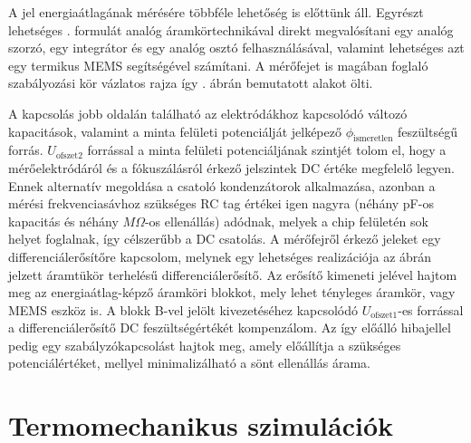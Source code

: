 
A jel energiaátlagának mérésére többféle lehetőség is előttünk áll. Egyrészt lehetséges . formulát analóg áramkörtechnikával direkt megvalósítani egy analóg szorzó, egy integrátor és egy analóg osztó felhasználásával, valamint lehetséges azt egy termikus MEMS segítségével számítani\cite{QTC_MEMS}. A mérőfejet is magában foglaló szabályozási kör vázlatos rajza így . ábrán bemutatott alakot ölti.


A kapcsolás jobb oldalán található az elektródákhoz kapcsolódó változó kapacitások, valamint a minta felületi potenciálját jelképező $\phi_\text{ismeretlen}$ feszültségű forrás. $U_\text{ofszet2}$ forrással a minta felületi potenciáljának szintjét tolom el, hogy a mérőelektródáról és a fókuszálásról érkező jelszintek DC értéke megfelelő legyen. Ennek alternatív megoldása a csatoló kondenzátorok alkalmazása, azonban a mérési frekvenciasávhoz szükséges RC tag értékei igen nagyra (néhány pF-os kapacitás és néhány $M\Omega$-os ellenállás) adódnak, melyek a chip felületén sok helyet foglalnak, így célszerűbb a DC csatolás. A mérőfejről érkező jeleket egy differenciálerősítőre kapcsolom, melynek egy lehetséges realizációja az ábrán jelzett áramtükör terhelésű differenciálerősítő. Az erősítő kimeneti jelével hajtom meg az energiaátlag-képző áramköri blokkot, mely lehet tényleges áramkör, vagy MEMS eszköz is. A blokk B-vel jelölt kivezetéséhez kapcsolódó $U_\text{ofszet1}$-es forrással a differenciálerősítő DC feszültségértékét kompenzálom. Az így előálló hibajellel pedig egy szabályzókapcsolást hajtok meg, amely előállítja a szükséges potenciálértéket, mellyel minimalizálható a sönt ellenállás árama.

\section{Termomechanikus szimulációk}


